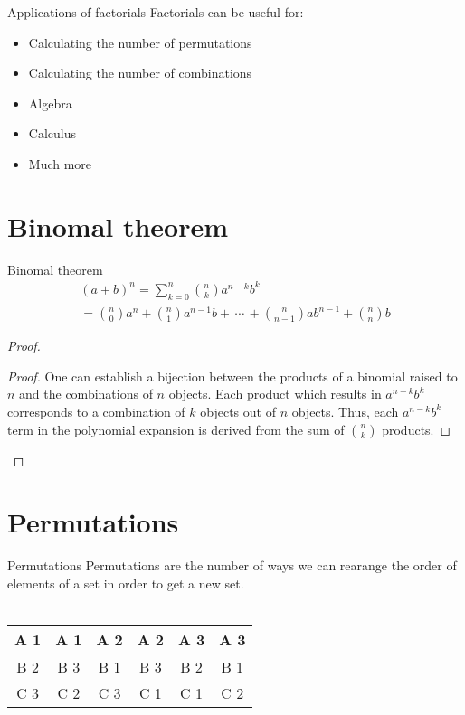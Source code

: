 \documentclass[11pt]{beamer}
\begin{document}
	\begin{frame}{Applications of factorials}
		Factorials can be useful for:
		\begin{itemize}
			\item <2-> Calculating the number of permutations
			\item <3-> Calculating the number of combinations
			\item <4-> Algebra 
			\item <5-> Calculus
			\item <6-> Much more 
		\end{itemize}
	\end{frame}
	\section{Binomal theorem}
	\begin{frame}{Binomal theorem}
	\begin{multline}
	(a + b)^n = \sum_{k=0}^{n}{n \choose k}a^{n-k}b^k  \\= {n \choose 0}a^n + {n \choose 1}a^{n-1}b + \, \cdots \, + {n \choose n-1}ab^{n-1} + {n \choose n}b
	\end{multline}
	\begin{proof}
		\begin{proof}
			One can establish a bijection between the products of a binomial
			raised to $n$ and the combinations of $n$ objects. Each product which results
			in $a^{n-k}b^k$ corresponds to a combination of $k$ objects out of $n$ objects. Thus, each  $a^{n-k} b^k$ term in the polynomial expansion is derived from the sum of ${n \choose k}$ products.
		\end{proof}
	\end{proof}
	\end{frame}

	\section{Permutations}
	\begin{frame}{Permutations}
		Permutations are the number of ways we can rearange the order of elements of a set in order to get a new set. \\ 
		\\
		\begin{center}
		\begin{tabular}{|c|c|c|c|c|c|}
			\hline 
			A 1 &  A 1 & A 2 & A 2 & A 3 & A 3 \\ 
			\hline 
			B 2 & B 3 & B 1  & B 3  & B 2  & B 1  \\
			\hline 
			C 3 & C 2  & C 3  & C 1  & C 1 & C 2  \\ 
			\hline 
			
		\end{tabular}\\ \\ \caption{Permutations of set $\{A, B, C\}$}
		\end{center}
	\end{frame}
\end{document}
